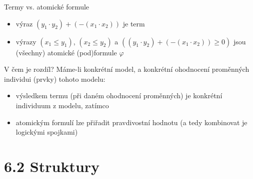 \documentclass{beamer}
\begin{document}
\begin{frame}{Termy vs. atomické formule}
    
    
    \begin{itemize}
        \item výraz \alert{$(y_1 \cdot y_2)+(-(x_1\cdot x_2))$} je \alert{term}
        \item výrazy \alert{$(x_1\leq y_1)$}, \alert{$(x_2\leq y_2)$} a \alert{$((y_1 \cdot y_2)+(-(x_1\cdot x_2))\geq 0)$} jsou (všechny) \alert{atomické (pod)formule} $\varphi$ 
    \end{itemize}
   
    V čem je rozdíl? Máme-li konkrétní model, a konkrétní \alert{ohodnocení proměnných} individui (prvky) tohoto modelu:
    
    \begin{itemize}
        \item výsledkem termu (při daném ohodnocení proměnných) je konkrétní \alert{individuum z modelu}, zatímco
        \item atomickým formulí lze přiřadit \alert{pravdivostní hodnotu} (a tedy kombinovat je logickými spojkami)
    \end{itemize}   

\end{frame}


\section{6.2 Struktury}
\end{document}
